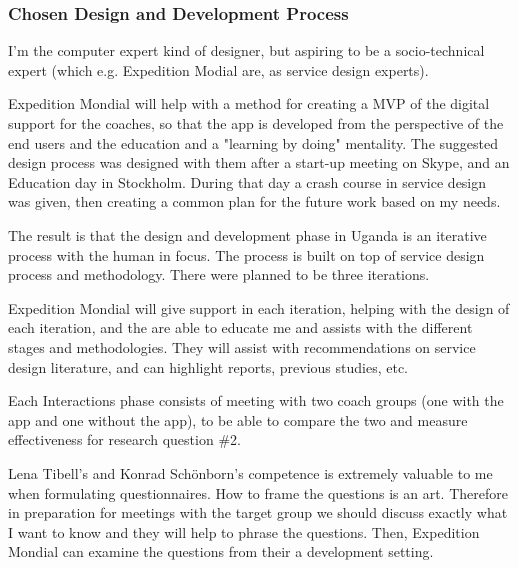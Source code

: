 \subsubsection{Chosen Design and Development Process}



I'm the computer expert kind of designer, but aspiring to be a socio-technical expert (which e.g. Expedition Modial are, as service design experts).

Expedition Mondial will help with a method for creating a MVP of the digital support for the coaches, so that the app is developed from the perspective of the end users and the education and a "learning by doing" mentality. The suggested design process was designed with them after a start-up meeting on Skype, and an Education day in Stockholm. During that day a crash course in service design was given, then creating a common plan for the future work based on my needs.

The result is that the design and development phase in Uganda is an iterative process with the human in focus. The process is built on top of service design process and methodology. There were planned to be three iterations.

Expedition Mondial will give support in each iteration, helping with the design of each iteration, and the are able to educate me and assists with the different stages and methodologies. They will assist with recommendations on service design literature, and can highlight reports, previous studies, etc.

Each Interactions phase consists of meeting with two coach groups (one with the app and one without the app), to be able to compare the two and measure effectiveness for research question \#2.

Lena Tibell's and Konrad Schönborn's  competence is extremely valuable to me when formulating questionnaires. How to frame the questions is an art.  Therefore in preparation for meetings with the target group we should discuss exactly what I want to know and they will help to phrase the questions. Then, Expedition Mondial can examine the questions from their a development setting.

